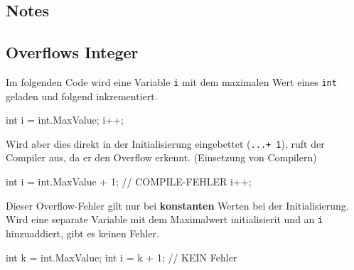 \documentclass[
  9pt,
  a4paperpaper,
  DIV=11]{scrartcl}
\newenvironment{Shaded}{}{}
\newcommand{\CommentTok}[1]{\textcolor[rgb]{0.42,0.45,0.49}{#1}}
\newcommand{\DataTypeTok}[1]{\textcolor[rgb]{0.84,0.23,0.29}{#1}}
\newcommand{\DecValTok}[1]{\textcolor[rgb]{0.00,0.36,0.77}{#1}}
\newcommand{\FunctionTok}[1]{\textcolor[rgb]{0.44,0.26,0.76}{#1}}
\newcommand{\NormalTok}[1]{\textcolor[rgb]{0.14,0.16,0.18}{#1}}
\newcommand{\OperatorTok}[1]{\textcolor[rgb]{0.14,0.16,0.18}{#1}}
\numberwithin{equation}{section}
\begin{document}
\begin{multicols}{2}
\hypertarget{notes}{%
\section{Notes}\label{notes}}

\hypertarget{overflows-integer}{%
\subsection{Overflows Integer}\label{overflows-integer}}

Im folgenden Code wird eine Variable \texttt{i} mit dem maximalen Wert
eines \texttt{int} geladen und folgend inkrementiert.

\begin{Shaded}
\begin{Highlighting}[]
\DataTypeTok{int}\NormalTok{ i }\OperatorTok{=} \DataTypeTok{int}\OperatorTok{.}\FunctionTok{MaxValue}\OperatorTok{;}
\NormalTok{i}\OperatorTok{++;}
\end{Highlighting}
\end{Shaded}

Wird aber dies direkt in der Initialisierung eingebettet
(\texttt{...+\ 1}), ruft der Compiler aus, da er den Overflow erkennt.
(Einsetzung von Compilern)

\begin{Shaded}
\begin{Highlighting}[]
\DataTypeTok{int}\NormalTok{ i }\OperatorTok{=} \DataTypeTok{int}\OperatorTok{.}\FunctionTok{MaxValue} \OperatorTok{+} \DecValTok{1}\OperatorTok{;} \CommentTok{// COMPILE{-}FEHLER}
\NormalTok{i}\OperatorTok{++;}
\end{Highlighting}
\end{Shaded}

\begin{tcolorbox}[enhanced jigsaw, breakable, colbacktitle=quarto-callout-caution-color!10!white, bottomtitle=1mm, toptitle=1mm, opacitybacktitle=0.6, colback=white, rightrule=.15mm, title=\textcolor{quarto-callout-caution-color}{\faFire}\hspace{0.5em}{Vorsicht}, toprule=.15mm, coltitle=black, colframe=quarto-callout-caution-color-frame, titlerule=0mm, arc=.35mm, bottomrule=.15mm, leftrule=.75mm, left=2mm, opacityback=0]

Dieser Overflow-Fehler gilt nur bei \textbf{konstanten} Werten bei der
Initialisierung. Wird eine separate Variable mit dem Maximalwert
initialisierit und an \texttt{i} hinzuaddiert, gibt es keinen Fehler.

\begin{Shaded}
\begin{Highlighting}[]
\DataTypeTok{int}\NormalTok{ k }\OperatorTok{=} \DataTypeTok{int}\OperatorTok{.}\FunctionTok{MaxValue}\OperatorTok{;}
\DataTypeTok{int}\NormalTok{ i }\OperatorTok{=}\NormalTok{ k }\OperatorTok{+} \DecValTok{1}\OperatorTok{;} \CommentTok{// KEIN Fehler}
\end{Highlighting}
\end{Shaded}

\end{tcolorbox}

\end{multicols}
\end{document}
